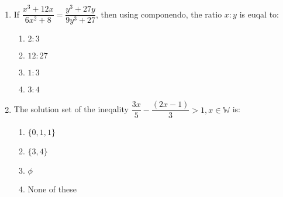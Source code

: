 \begin{enumerate}[label=(\roman*)]
        \begin{multicols}{2}
        \begin{enumerate}[label=(\alph*)]
            \item $x \le -\dfrac12$
            \item $x \ge -\dfrac12$
            \item $-1\dfrac12 < x < -\dfrac32$
            \item None of these
        \end{enumerate}
        \end{multicols}

    \item If $\dfrac{x^3 + 12x}{6x^2 + 8} = \dfrac{y^3 + 27y}{9y^3 + 27}$, 
        then using componendo, the ratio $x:y$ is euqal to:

        \begin{multicols}{2}
        \begin{enumerate}[label=(\alph*)]
            \item $2:3$
            \item $12:27$
            \item $1:3$
            \item $3:4$
        \end{enumerate}
        \end{multicols}

    \item The solution set of the ineqality 
        $\dfrac{3x}{5} - \dfrac{(2x-1)}{3} > 1, x \in \mathbb{W}$ is:

        \begin{multicols}{2}
        \begin{enumerate}[label=(\alph*)]
            \item $\{0,1,1\}$
            \item $\{3,4\}$
            \item $\phi$
            \item None of these
        \end{enumerate}
        \end{multicols}

\end{enumerate}


